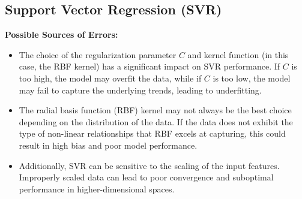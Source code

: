\documentclass[12pt]{report}
\begin{document}
\subsection{Support Vector Regression (SVR)}
\textbf{Possible Sources of Errors:} 
\begin{itemize}
    \item The choice of the regularization parameter \(C\) and kernel function (in this case, the RBF kernel) has a significant impact on SVR performance. If \(C\) is too high, the model may overfit the data, while if \(C\) is too low, the model may fail to capture the underlying trends, leading to underfitting.
    \item The radial basis function (RBF) kernel may not always be the best choice depending on the distribution of the data. If the data does not exhibit the type of non-linear relationships that RBF excels at capturing, this could result in high bias and poor model performance.
    \item Additionally, SVR can be sensitive to the scaling of the input features. Improperly scaled data can lead to poor convergence and suboptimal performance in higher-dimensional spaces.
\end{itemize}
\end{document}
